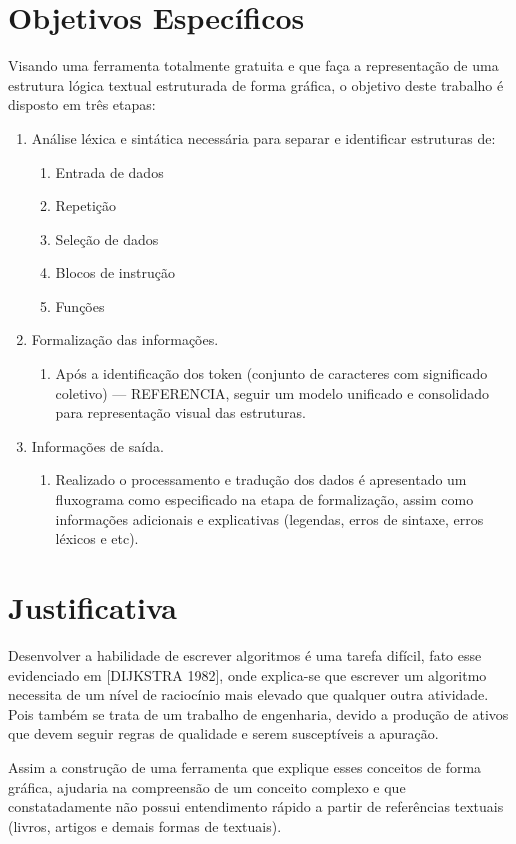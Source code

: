 \label{og}

\section{Objetivos Específicos}\label{oe}
Visando uma ferramenta totalmente gratuita e que faça a representação de uma estrutura lógica textual estruturada de forma gráfica, o objetivo deste trabalho é disposto em três etapas:
\begin{enumerate}

 \item Análise léxica e sintática necessária para separar e identificar estruturas de:
    \begin{enumerate}
    \item Entrada de dados
    \item Repetição
    \item Seleção de dados
    \item Blocos de instrução
    \item Funções
    \end{enumerate}
    
 \item Formalização das informações.
    \begin{enumerate}
    \item Após a identificação dos token (conjunto de caracteres com significado coletivo) --- REFERENCIA, seguir um modelo unificado e consolidado para representação visual das estruturas.
    \end{enumerate}
    
 \item Informações de saída.
    \begin{enumerate}
    \item Realizado o processamento e tradução dos dados é apresentado um fluxograma como especificado na etapa de formalização, assim como informações adicionais e explicativas (legendas, erros de sintaxe, erros léxicos e etc).
    \end{enumerate}
    
\end{enumerate}


\section{Justificativa}
Desenvolver a habilidade de escrever algoritmos é uma tarefa difícil, fato esse evidenciado em [DIJKSTRA 1982], onde explica-se que escrever um algoritmo necessita de um nível de raciocínio mais elevado que qualquer outra atividade. Pois também se trata de um trabalho de engenharia, devido a produção de ativos que devem seguir regras de qualidade e serem susceptíveis a apuração.\par
Assim a construção de uma ferramenta que explique esses conceitos de forma gráfica, ajudaria na compreensão de um conceito complexo e que constatadamente não possui entendimento rápido a partir de referências textuais (livros, artigos e demais formas de textuais).
\label{just}


